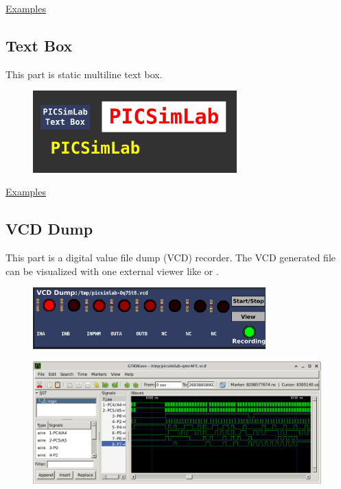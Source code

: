 \href{https://lcgamboa.github.io/picsimlab_examples/parts_Signal_Generator.html}{Examples}


\subsection{Text Box}

This part is static multiline text box. 

\begin{figure}[H]
\center
\includegraphics[width=0.7\textwidth]{img/part_text_box.png} 
\end{figure}


\href{https://lcgamboa.github.io/picsimlab_examples/parts_Text_Box.html}{Examples}


\subsection{VCD Dump}

This part is a digital value file dump (VCD) recorder. The VCD generated file can be visualized with one external viewer like 
 or . 

\begin{figure}[H]
\center
\includegraphics[width=0.8\textwidth]{img/part_vcd_dump.png} 
\end{figure}



\begin{figure}[H]
\center
\includegraphics[width=0.99\textwidth]{img/part_vcd_dump_gtkwave.png} 
\end{figure}

